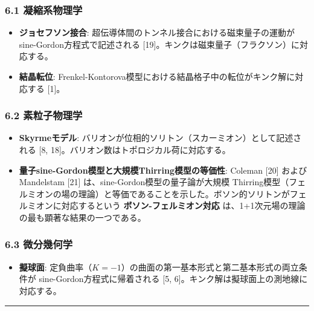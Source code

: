 \documentclass[a4paper,11pt]{ltjsarticle}
\providecommand{\tightlist}{\setlength{\itemsep}{0pt}\setlength{\parskip}{0pt}}
\begin{document}
\subsubsection{6.1
凝縮系物理学}\label{ux51ddux7e2eux7cfbux7269ux7406ux5b66}

\begin{itemize}
\tightlist
\item
  \textbf{ジョセフソン接合}:
  超伝導体間のトンネル接合における磁束量子の運動が
  sine-Gordon方程式で記述される
  {[}19{]}。キンクは磁束量子（フラクソン）に対応する。
\item
  \textbf{結晶転位}:
  Frenkel-Kontorova模型における結晶格子中の転位がキンク解に対応する
  {[}1{]}。
\end{itemize}

\subsubsection{6.2
素粒子物理学}\label{ux7d20ux7c92ux5b50ux7269ux7406ux5b66}

\begin{itemize}
\tightlist
\item
  \textbf{Skyrmeモデル}:
  バリオンが位相的ソリトン（スカーミオン）として記述される {[}8,
  18{]}。バリオン数はトポロジカル荷に対応する。
\item
  \textbf{量子sine-Gordon模型と大規模Thirring模型の等価性}: Coleman
  {[}20{]} および Mandelstam {[}21{]}
  は、sine-Gordon模型の量子論が大規模
  Thirring模型（フェルミオンの場の理論）と等価であることを示した。ボソン的ソリトンがフェルミオンに対応するという
  \textbf{ボソン-フェルミオン対応}
  は、1+1次元場の理論の最も顕著な結果の一つである。
\end{itemize}

\subsubsection{6.3 微分幾何学}\label{ux5faeux5206ux5e7eux4f55ux5b66}

\begin{itemize}
\tightlist
\item
  \textbf{擬球面}:
  定負曲率（\(K = -1\)）の曲面の第一基本形式と第二基本形式の両立条件が
  sine-Gordon方程式に帰着される {[}5,
  6{]}。キンク解は擬球面上の測地線に対応する。
\end{itemize}

\begin{center}\rule{0.5\linewidth}{0.5pt}\end{center}
\end{document}
